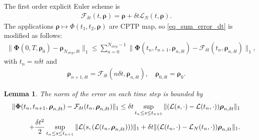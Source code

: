 \documentclass[a4paper,onecolumn,amsmath,amssymb,amsfonts,accepted=2026-03-06]{quantumarticle}
\newcommand{\xL}{\mathcal{L}}
\newcommand{\xF}{\mathcal{F}}
\newtheorem{lemma}{Lemma}
\begin{document}
The first order explicit Euler scheme is
\begin{align}
    \xF_{\delta t}(t,\boldsymbol{\rho})=\boldsymbol{\rho} + \delta t \xL_N(t,\boldsymbol{\rho}).
\end{align}
The applications $\boldsymbol{\rho} \mapsto \Phi(t_1,t_2,\boldsymbol{\rho})$ are CPTP map, so \cref{eq_sum_error_dt} is modified as follows:
\begin{align}
    \|\boldsymbol{\Phi}(0,T,\boldsymbol{\rho}_0)- \boldsymbol{\rho}_{N_{step},\delta t}\|_1 \leq \sum_{n=0}^{N_{step}-1} \|\boldsymbol{\Phi}(t_n,t_{n+1},\boldsymbol{\rho}_{n,\delta t})- \xF_{\delta t}(t_n,\boldsymbol{\rho}_{n,\delta t})\|_1,
\end{align}
with $t_n=n\delta t$ and
\begin{align}
    \boldsymbol{\rho}_{n+1,\delta t}= \xF_{\delta t}(n\delta t,\boldsymbol{\rho}_{n,\delta t}),\quad \boldsymbol{\rho}_{0,\delta t}=\boldsymbol{\rho}_0.
\end{align}

\begin{lemma}
    \label{lem_time_dep_estimate}
    The norm of the error on each time step is bounded by
    \begin{align}
        \label{eq_lem_time_dep_estimate}
        \notag
        \|\boldsymbol{\Phi}(t_n,t_{n+1},\boldsymbol{\rho}_{n,\delta t})- \xF_{\delta t}(t_n,\boldsymbol{\rho}_{n,\delta t})\|_1 \leq \delta t \sup_{t_n \leq s \leq t_{n+1}} \| (\xL(s,\cdot)-\xL(t_n,\cdot))\boldsymbol{\rho}_{n,\delta t}\|_1 \\
        + \frac{\delta t ^2}{2} \sup_{t_n \leq s \leq t_{n+1}} \|\xL(s,(\xL(t_n,\boldsymbol{\rho}_{n,\delta t})))\|_1+ \delta t \|(\xL(t_n,\cdot)-\xL_N(t_n,\cdot))\boldsymbol{\rho}_{n,\delta t}\|_1.
    \end{align}
\end{lemma}
\end{document}
